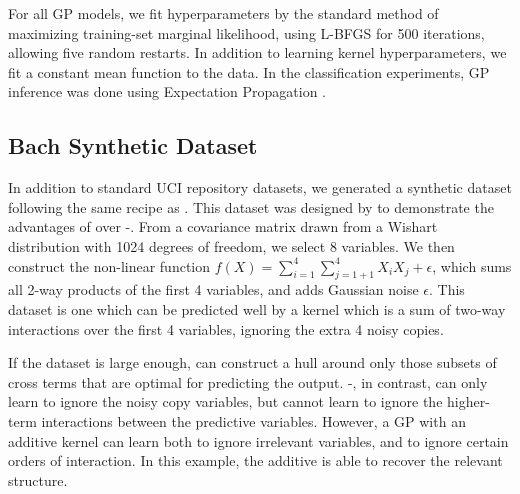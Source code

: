 For all GP models, we fit hyperparameters by the standard method of maximizing training-set marginal likelihood, using L-BFGS \cite{nocedal1980updating} for 500 iterations, allowing five random restarts.  In addition to learning kernel hyperparameters, we fit a constant mean function to the data.
%
In the classification experiments, GP inference was done using Expectation Propagation \cite{minka2001expectation}.

\subsection{Bach Synthetic Dataset}
In addition to standard UCI repository datasets, we generated a synthetic dataset following the same recipe as \cite{DBLP:journals/corr/abs-0909-0844}.
This dataset was designed by \cite{DBLP:journals/corr/abs-0909-0844} to demonstrate the advantages of \HKL{} over \gp{}-\ARD{}.
From a covariance matrix drawn from a Wishart distribution with 1024 degrees of freedom, we select 8 variables.
We then construct the non-linear function $f(X) = \sum_{i=1}^4 \sum_{j=1+1}^4 X_i X_j + \epsilon$, which sums all 2-way products of the first 4 variables, and adds Gaussian noise $\epsilon$.
This dataset is one which can be predicted well by a kernel which is a sum of two-way interactions over the first 4 variables, ignoring the extra 4 noisy copies.

If the dataset is large enough, \HKL{} can construct a hull around only those subsets of cross terms that are optimal for predicting the output.
\gp{}-\ARD{}, in contrast, can only learn to ignore the noisy copy variables, but cannot learn to ignore the higher-term interactions between the predictive variables.
However, a GP with an additive kernel can learn both to ignore irrelevant variables, and to ignore certain orders of interaction.
In this example, the additive \gp{} is able to recover the relevant structure.

%

 
